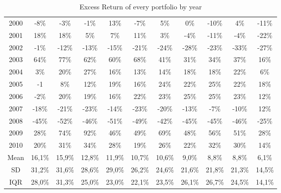 \documentclass[11pt]{article}
\begin{document}
\begin{table}[H]
\begin{tabular}{ccccccccccc}
    2000 & -8\% & -3\% & -1\% & 13\% & -7\% & 5\% & 0\% & -10\% & 4\% & -11\% \\
    2001 & 18\% & 18\% & 5\% & 7\% & 11\% & 3\% & -4\% & -11\% & -4\% & -22\% \\
    \rowcolor{myred} 2002 & -1\% & -12\% & -13\% & -15\% & -21\% & -24\% & -28\% & -23\% & -33\% & -27\% \\
    \rowcolor{myblue} 2003 & 64\% & 77\% & 62\% & 60\% & 68\% & 41\% & 31\% & 34\% & 37\% & 16\% \\
    2004 & 3\% & 20\% & 27\% & 16\% & 13\% & 14\% & 18\% & 18\% & 22\% & 6\% \\
    2005 & -1 & 8\% & 12\% & 19\% & 16\% & 24\% & 22\% & 25\% & 22\% & 18\% \\
    2006 & -2\% & 20\% & 19\% & 16\% & 22\% & 23\% & 25\% & 25\% & 23\% & 12\% \\
    2007 & -18\% & -21\% & -23\% & -14\% & -23\% & -20\% & -13\% & -7\% & -10\% & 12\% \\
    \rowcolor{myred} 2008 & -45\% & -52\% & -46\% & -51\% & -49\% & -42\% & -45\% & -45\% & -46\% & -25\% \\
    \rowcolor{myblue} 2009 & 28\% & 74\% & 92\% & 46\% & 49\% & 69\% & 48\% & 56\% & 51\% & 28\% \\
    2010 & 20\% & 31\% & 34\% & 28\% & 19\% & 26\% & 22\% & 32\% & 30\% & 14\% \\
    \midrule
    \midrule
    Mean & 16,1\% & 15,9\% & 12,8\% & 11,9\% & 10,7\% & 10,6\% & 9,0\% & 8,8\% & 8,8\% & 6,1\% \\
    SD & 31,2\% & 31,6\% & 28,6\% & 29,0\% & 26,2\% & 24,6\% & 21,6\% & 21,8\% & 21,3\% & 14,5\% \\
    IQR & 28,0\% & 31,3\% & 25,0\% & 23,0\% & 22,1\% & 23,5\% & 26,1\% & 26,7\% & 24,5\% & 14,1\% \\
    \bottomrule
    \bottomrule
    \end{tabular}
    \caption{Excess Return of every portfolio by year} 
    \label{tab:month_year_er}
\end{table}
\end{document}
